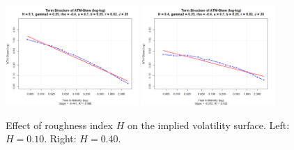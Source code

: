 \begin{figure}[H]
    \includegraphics[width=0.45\textwidth]{figures/5.2 Individual Parameter Effects/H=0.10_atm_skew_log.png}
	\includegraphics[width=0.45\textwidth]{figures/5.2 Individual Parameter Effects/H=0.40_atm_skew_log.png}
    \caption{Effect of roughness index $H$ on the implied volatility surface. Left: $H=0.10$. Right: $H=0.40$.}
    \label{fig:H_effect}
\end{figure}

